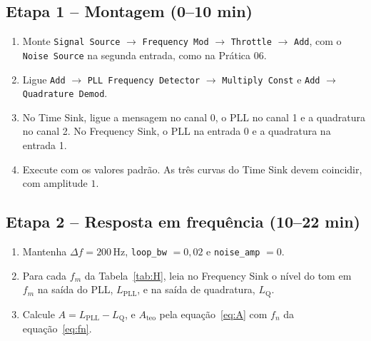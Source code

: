 \documentclass[11pt,a4paper]{article}
\begin{document}
\subsection*{Etapa 1 -- Montagem (0--10 min)}

\begin{instrucao}
\begin{enumerate}[label=\arabic*.]
  \item Monte \texttt{Signal Source} $\to$ \texttt{Frequency Mod} $\to$
    \texttt{Throttle} $\to$ \texttt{Add}, com o \texttt{Noise Source} na
    segunda entrada, como na Prática 06.
  \item Ligue \texttt{Add} $\to$ \texttt{PLL Frequency Detector} $\to$
    \texttt{Multiply Const} e \texttt{Add} $\to$ \texttt{Quadrature Demod}.
  \item No Time Sink, ligue a mensagem no canal 0, o PLL no canal 1 e a
    quadratura no canal 2. No Frequency Sink, o PLL na entrada 0 e a quadratura
    na entrada 1.
  \item Execute com os valores padrão. As três curvas do Time Sink devem
    coincidir, com amplitude $1$.
\end{enumerate}
\end{instrucao}

\subsection*{Etapa 2 -- Resposta em frequência (10--22 min)}

\begin{instrucao}
\begin{enumerate}[label=\arabic*.]
  \item Mantenha $\Delta f = 200$\,Hz, \texttt{loop\_bw} $= 0{,}02$ e
    \texttt{noise\_amp} $= 0$.
  \item Para cada $f_m$ da Tabela~\ref{tab:H}, leia no Frequency Sink o nível
    do tom em $f_m$ na saída do PLL, $L_\text{PLL}$, e na saída de quadratura,
    $L_\text{Q}$.
  \item Calcule $A = L_\text{PLL} - L_\text{Q}$, e $A_\text{teo}$ pela
    equação~\eqref{eq:A} com $f_n$ da equação~\eqref{eq:fn}.
\end{enumerate}
\end{instrucao}
\end{document}
